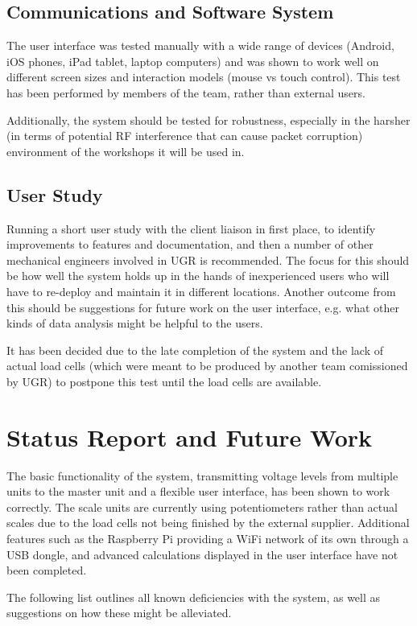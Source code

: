 \subsection{Communications and Software System}
The user interface was tested manually with a wide range of devices (Android, iOS phones, iPad tablet, laptop computers) and was shown to work well on different screen sizes and interaction models (mouse vs touch control). This test has been performed by members of the team, rather than external users.

Additionally, the system should be tested for robustness, especially in the harsher (in terms of potential RF interference that can cause packet corruption) environment of the workshops it will be used in.

\subsection{User Study}
Running a short user study with the client liaison in first place, to identify improvements to features and documentation, and then a number of other mechanical engineers involved in UGR is recommended. The focus for this should be how well the system holds up in the hands of inexperienced users who will have to re-deploy and maintain it in different locations. Another outcome from this should be suggestions for future work on the user interface, e.g. what other kinds of data analysis might be helpful to the users.

It has been decided due to the late completion of the system and the lack of actual load cells (which were meant to be produced by another team comissioned by UGR) to postpone this test until the load cells are available.

\section{Status Report and Future Work}
The basic functionality of the system, transmitting voltage levels from multiple units to the master unit and a flexible user interface, has been shown to work correctly. The scale units are currently using potentiometers rather than actual scales due to the load cells not being finished by the external supplier. Additional features such as the Raspberry Pi providing a WiFi network of its own through a USB dongle, and advanced calculations displayed in the user interface have not been completed.

The following list outlines all known deficiencies with the system, as well as suggestions on how these might be alleviated.


